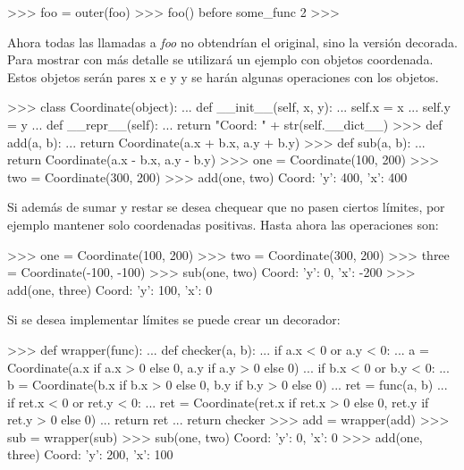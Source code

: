 \begin{pyglist} [language=python]
>>> foo = outer(foo)
>>> foo()
before some_func
2
>>> 
\end{pyglist}

Ahora todas las llamadas a \textit{foo} no obtendrían el original, sino la versión decorada.\\

Para mostrar con más detalle se utilizará un ejemplo con objetos coordenada. Estos objetos serán pares x e y y se harán algunas operaciones con los objetos.

\begin{pyglist} [language=python]
>>> class Coordinate(object):
...     def __init__(self, x, y):
...         self.x = x
...         self.y = y
...     def __repr__(self):
...         return "Coord: " + str(self.__dict__)
>>> def add(a, b):
...     return Coordinate(a.x + b.x, a.y + b.y)
>>> def sub(a, b):
...     return Coordinate(a.x - b.x, a.y - b.y)
>>> one = Coordinate(100, 200)
>>> two = Coordinate(300, 200)
>>> add(one, two)
Coord: {'y': 400, 'x': 400}
\end{pyglist}

Si además de sumar y restar se desea chequear que no pasen ciertos límites, por ejemplo mantener solo coordenadas positivas. Hasta ahora las operaciones son:\\

\begin{pyglist} [language=python]
>>> one = Coordinate(100, 200)
>>> two = Coordinate(300, 200)
>>> three = Coordinate(-100, -100)
>>> sub(one, two)
Coord: {'y': 0, 'x': -200}
>>> add(one, three)
Coord: {'y': 100, 'x': 0}
\end{pyglist}

Si se desea implementar límites se puede crear un decorador:\\

\begin{pyglist} [language=python]
>>> def wrapper(func):
...     def checker(a, b):
...         if a.x < 0 or a.y < 0:
...             a = Coordinate(a.x if a.x > 0 else 0, a.y if a.y > 0 else 0)
...         if b.x < 0 or b.y < 0:
...             b = Coordinate(b.x if b.x > 0 else 0, b.y if b.y > 0 else 0)
...         ret = func(a, b)
...         if ret.x < 0 or ret.y < 0:
...             ret = Coordinate(ret.x if ret.x > 0 else 0,  
                                 ret.y if ret.y > 0 else 0)
...         return ret
...     return checker
>>> add = wrapper(add)
>>> sub = wrapper(sub)
>>> sub(one, two)
Coord: {'y': 0, 'x': 0}
>>> add(one, three)
Coord: {'y': 200, 'x': 100}
\end{pyglist}

